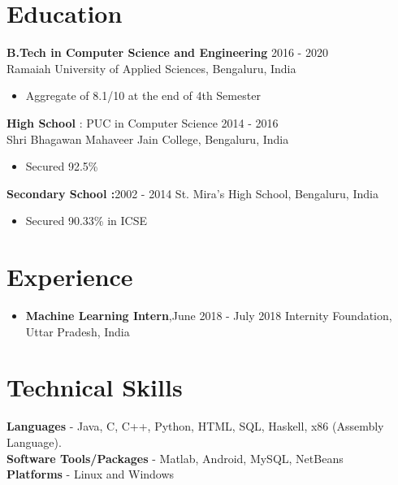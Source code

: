 \documentclass[margin, centered]{res}
\begin{document}
\begin{resume}

\section{Education}
\textbf{B.Tech in Computer Science and Engineering } \hfill 2016 - 2020 \\
\textnormal{Ramaiah University of Applied Sciences, Bengaluru, India}
\begin{itemize}
 \item Aggregate of 8.1/10 at the end of 4th Semester
\end{itemize}
\textbf{High School} : {PUC in Computer Science} \hfill 2014 - 2016 \\
\textnormal{Shri Bhagawan Mahaveer Jain College, Bengaluru, India}
\begin{itemize}
 \item Secured 92.5\%
\end{itemize}
\textbf{Secondary School :}\hfill 2002 - 2014
\newline
\textnormal{St. Mira's High School, Bengaluru, India} 
\begin{itemize}
 \item Secured 90.33\% in ICSE
\end{itemize}
%
%
\section{Experience}
\begin{itemize}[leftmargin=*]
\item  \textbf{Machine Learning Intern},\hfill June 2018 - July 2018
\newline \textnormal{Internity Foundation, Uttar Pradesh, India}  
\end{itemize} 
%
%
\section{Technical \hspace{2mm} Skills}
\textbf{Languages} - Java, C, C++, Python, HTML, SQL, Haskell, x86 (Assembly Language). \\
\textbf{Software Tools/Packages} - Matlab, Android, MySQL, NetBeans\\
\textbf{Platforms} - Linux and Windows


\end{resume}
\end{document}
